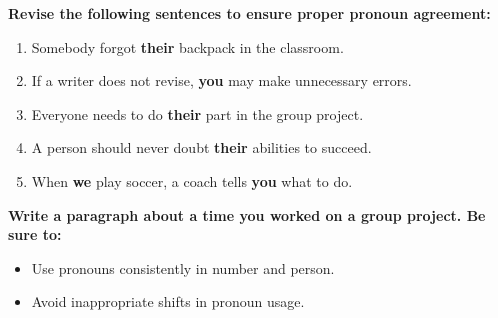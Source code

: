 \documentclass[12pt]{article}
\begin{document}
\vspace{1em}

\begin{tcolorbox}[colframe=black!60, colback=white, 
coltitle=black, colbacktitle=black!15, fonttitle=\bfseries\Large, 
title=Independent Practice, halign title=center, left=10pt, right=10pt, top=10pt, bottom=15pt]
\textbf{Revise the following sentences to ensure proper pronoun agreement:}
\begin{enumerate}[itemsep=3em]
    \item Somebody forgot \textbf{their} backpack in the classroom.  
    \item If a writer does not revise, \textbf{you} may make unnecessary errors.  
    \item Everyone needs to do \textbf{their} part in the group project.  
    \item A person should never doubt \textbf{their} abilities to succeed.  
    \item When \textbf{we} play soccer, a coach tells \textbf{you} what to do.  
\end{enumerate}
\end{tcolorbox}

\vspace{1em}

\begin{tcolorbox}[colframe=black!60, colback=white, 
coltitle=black, colbacktitle=black!15, fonttitle=\bfseries\Large, 
title=Exit Ticket, halign title=center, left=10pt, right=10pt, top=5pt, bottom=15pt]

\textbf{Write a paragraph about a time you worked on a group project. Be sure to:}
\begin{itemize}
    \item Use pronouns consistently in number and person.  
    \item Avoid inappropriate shifts in pronoun usage.  
\end{itemize}

\vspace{8em}

\end{tcolorbox}
\end{document}
